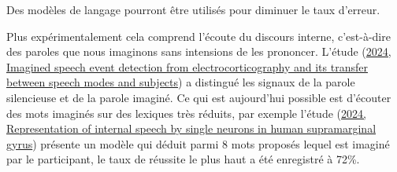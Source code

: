 \documentclass[a4paper,11pt]{article}
\begin{document}
\begin{blogmain}
Des modèles de langage pourront être utilisés pour diminuer le taux d'erreur.

Plus expérimentalement cela comprend l'écoute du discours interne, c'est-à-dire des paroles que nous imaginons sans intensions de les prononcer.
L'étude (\href{https://www.nature.com/articles/s42003-024-06518-6}{2024, Imagined speech event detection from electrocorticography and its transfer between speech modes and subjects}) a distingué les signaux de la parole silencieuse et de la parole imaginé.
Ce qui est aujourd'hui possible est d'écouter des mots imaginés sur des lexiques très réduits, par exemple l'étude (\href{https://www.nature.com/articles/s41562-024-01867-y}{2024, Representation of internal speech by single neurons in human supramarginal gyrus}) présente un modèle qui déduit parmi 8 mots proposés lequel est imaginé par le participant, le taux de réussite le plus haut a été enregistré à 72\%.
\end{blogmain}
\end{document}
